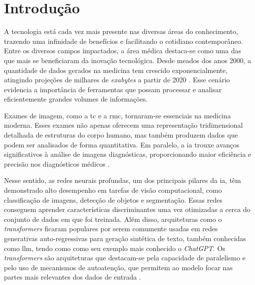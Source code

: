
\chapter[Introdução]{Introdução}
\label{chap:introducao}
\vspace{-\baselineskip} %

A tecnologia está cada vez mais presente nas diversas áreas do conhecimento, trazendo uma infinidade de benefícios e facilitando o cotidiano contemporâneo. Entre os diversos campos impactados, a área médica destaca-se como uma das que mais se beneficiaram da inovação tecnológica. Desde meados dos anos 2000, a quantidade de dados gerados na medicina tem crescido exponencialmente, atingindo projeções de milhares de \textit{exabytes} a partir de 2020 \cite{gantzDIGITALUNIVERSE2020}. Esse cenário evidencia a importância de ferramentas que possam processar e analisar eficientemente grandes volumes de informações.

Exames de imagem, como a \gls{tc} e a \gls{rmc}, tornaram-se essenciais na medicina moderna. Esses exames não apenas oferecem uma representação tridimensional detalhada de estruturas do corpo humano, mas também produzem dados que podem ser analisados de forma quantitativa. Em paralelo, a \gls{ia} trouxe avanços significativos à análise de imagens diagnósticas, proporcionando maior eficiência e precisão nos diagnósticos médicos \cite{argentieroApplicationsArtificialIntelligence2022}.

Nesse sentido, as redes neurais profundas, um dos principais pilares da \gls{ia}, têm demonstrado alto desempenho em tarefas de visão computacional, como classificação de imagens, detecção de objetos e segmentação. Essas redes conseguem aprender características discriminantes uma vez otimizadas a cerca do conjunto de dados em que foi treinada. Além disso, arquiteturas como o \textit{transformers} ficaram populares por serem comumente usadas em redes generativas auto-regressivas para geração sintética de texto, também conhecidas como \gls{llm}, tendo como como seu exemplo mais conhecido o \textit{ChatGPT}. Os \textit{transformers} são arquiteturas que destacam-se pela capacidade de paralelismo e pelo uso de mecanismos de autoatenção, que permitem ao modelo focar nas partes mais relevantes dos dados de entrada \cite{russell2020artificial}.

